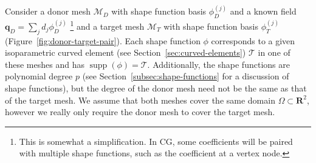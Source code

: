 \documentclass[oneside, reqno]{amsart}
\theoremstyle{definition}
\newcommand{\reals}{\mathbf{R}}
\begin{document}
Consider a donor mesh \(\mathcal{M}_D\) with shape function basis
\(\phi_D^{(j)}\) and a known field \(\bm{q}_D = \sum_j d_j \phi_D^{(j)}\)
\footnote{This is somewhat a simplification. In CG,
some coefficients will be paired with multiple shape functions, such
as the coefficient at a vertex node.}
and a
target mesh \(\mathcal{M}_T\) with shape function basis \(\phi_T^{(j)}\)
(Figure~\ref{fig:donor-target-pair}).
Each shape function \(\phi\) corresponds to a
given isoparametric curved element (see Section~\ref{sec:curved-elements})
\(\mathcal{T}\) in one of these meshes and has
\(\operatorname{supp}(\phi) = \mathcal{T}\).
Additionally, the shape functions are polynomial degree \(p\) (see
Section~\ref{subsec:shape-functions} for a discussion of shape functions),
but the degree of the donor mesh need not be the same as that of the
target mesh. We assume that both meshes cover the same domain \(\Omega \subset
\reals^2\), however we really only require the donor mesh to cover the
target mesh.
\end{document}
